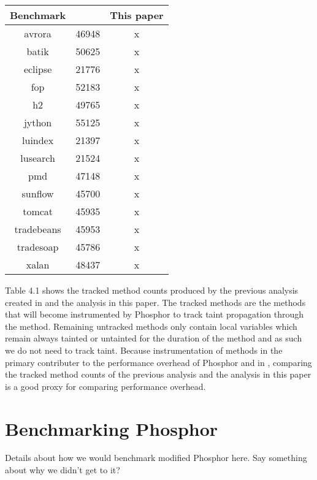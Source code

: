 \begin{center}
  \begin{tabular}{|c|c|c|}
    \hline
    Benchmark & \cite{manoj_project} & This paper \\ \hline
    avrora & 46948 & x \\\hline
    batik & 50625 & x \\\hline
    eclipse & 21776 & x \\\hline
    fop & 52183 & x \\\hline
    h2 & 49765 & x \\\hline
    jython & 55125 & x \\\hline
    luindex & 21397 & x \\\hline
    lusearch & 21524 & x \\\hline
    pmd & 47148 & x \\\hline
    sunflow & 45700 & x \\\hline
    tomcat & 45935 & x \\\hline
    tradebeans & 45953 & x \\\hline
    tradesoap & 45786 & x \\\hline
    xalan & 48437 & x \\\hline
  \end{tabular}
\end{center}

Table 4.1 shows the tracked method counts produced by the previous analysis created in \cite{manoj_project} and the analysis in this paper. The tracked methods are the methods that will become instrumented by Phosphor to track taint propagation through the method. Remaining untracked methods only contain local variables which remain always tainted or untainted for the duration of the method and as such we do not need to track taint. Because instrumentation of methods in the primary contributer to the performance overhead of Phosphor and in \cite{manoj_phosphor}, comparing the tracked method counts of the previous analysis and the analysis in this paper is a good proxy for comparing performance overhead.
    
\section{Benchmarking Phosphor}



Details about how we would benchmark modified Phosphor here. Say something about why we didn't get to it?
